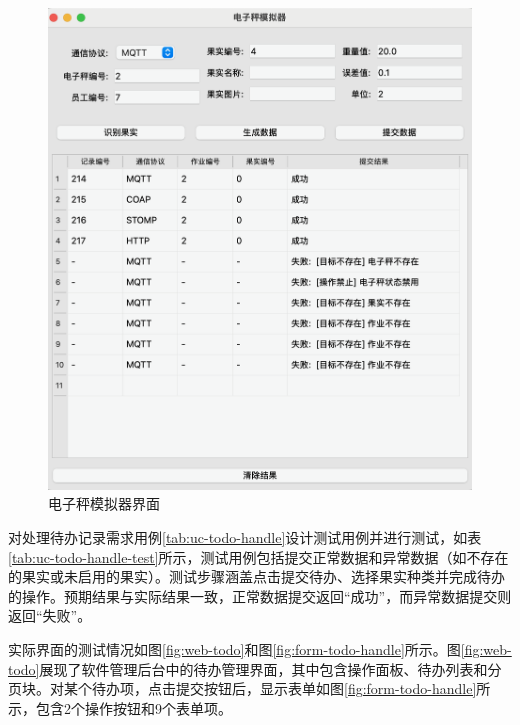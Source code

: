 \begin{figure}
    \centering
    \includegraphics[width=0.9\linewidth]{../result/scale-simulator.png}
    \caption{电子秤模拟器界面}
    \label{fig:scale-simulator}
\end{figure}

对处理待办记录需求用例\ref{tab:uc-todo-handle}设计测试用例并进行测试，如表\ref{tab:uc-todo-handle-test}所示，测试用例包括提交正常数据和异常数据（如不存在的果实或未启用的果实）。测试步骤涵盖点击提交待办、选择果实种类并完成待办的操作。预期结果与实际结果一致，正常数据提交返回“成功”，而异常数据提交则返回“失败”。

实际界面的测试情况如图\ref{fig:web-todo}和图\ref{fig:form-todo-handle}所示。图\ref{fig:web-todo}展现了软件管理后台中的待办管理界面，其中包含操作面板、待办列表和分页块。对某个待办项，点击提交按钮后，显示表单如图\ref{fig:form-todo-handle}所示，包含2个操作按钮和9个表单项。

